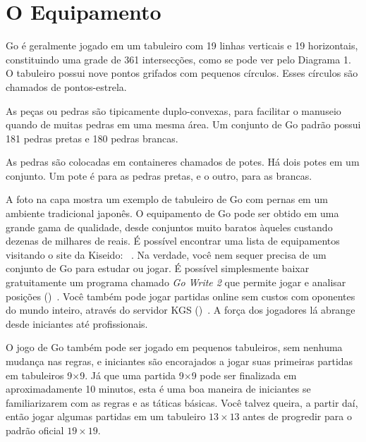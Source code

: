 \chapter{O Equipamento}

Go é geralmente jogado em um tabuleiro com 19 linhas verticais e 19 horizontais, constituindo uma grade de 361 intersecções, como se pode ver pelo Diagrama 1. O tabuleiro possui nove pontos grifados com pequenos círculos. Esses círculos são chamados de pontos-estrela.

As peças ou pedras são tipicamente duplo-convexas, para facilitar o manuseio quando de muitas pedras em uma mesma área. Um conjunto de Go padrão possui 181 pedras pretas e 180 pedras brancas.

\begin{center}
\end{center}

As pedras são colocadas em containeres chamados de potes. Há dois potes em um conjunto. Um pote é para as pedras pretas, e o outro, para as brancas.

A foto na capa mostra um exemplo de tabuleiro de Go com pernas em um ambiente tradicional japonês. O equipamento de Go pode ser obtido em uma grande gama de qualidade, desde conjuntos muito baratos àqueles custando dezenas de milhares de reais. É possível encontrar uma lista de equipamentos visitando o site da Kiseido: \href{https://www.kiseido.com}{}~\cite{kiseido}. Na verdade, você nem sequer precisa de um conjunto de Go para estudar ou jogar. É possível simplesmente baixar gratuitamente um programa chamado \emph{Go Write 2} que permite jogar e analisar posições (\href{https://www.gowrite.net/GOWrite2_download.html}{})~\cite{gowrite}. Você também pode jogar partidas online sem custos com oponentes do mundo inteiro, através do servidor KGS (\href{https://www.gokgs.com}{})~\cite{kgs}. A força dos jogadores lá abrange desde iniciantes até profissionais.

O jogo de Go também pode ser jogado em pequenos tabuleiros, sem nenhuma mudança nas regras, e iniciantes são encorajados a jogar suas primeiras partidas em tabuleiros 9\(\times\)9. Já que uma partida 9\(\times\)9 pode ser finalizada em aproximadamente 10 minutos, esta é uma boa maneira de iniciantes se familiarizarem com as regras e as táticas básicas. Você talvez queira, a partir daí, então jogar algumas partidas em um tabuleiro $13\times13$ antes de progredir para o padrão oficial $19\times19$.